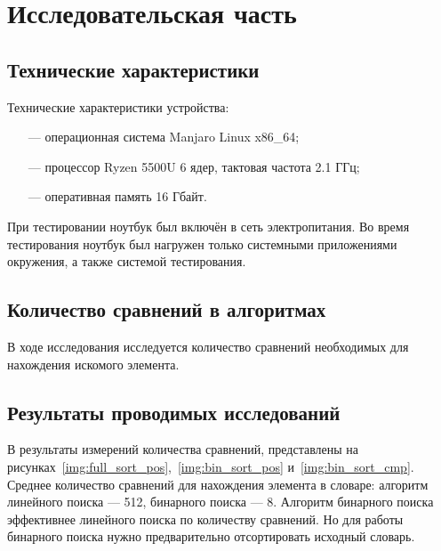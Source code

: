 \chapter{Исследовательская часть}

\section{Технические характеристики}

Технические характеристики устройства:

\begin{itemize}
	\item[---] операционная система Manjaro Linux x86\_64;
	\item[---] процессор Ryzen 5500U 6 ядер, тактовая частота 2.1 ГГц;
	\item[---] оперативная память 16 Гбайт.
\end{itemize}

При тестировании ноутбук был включён в сеть электропитания. Во время тестирования ноутбук был нагружен только системными приложениями окружения, а также системой тестирования.

\section{Количество сравнений в алгоритмах}
В ходе исследования исследуется количество сравнений необходимых для нахождения искомого элемента.


\section{Результаты проводимых исследований}

В результаты измерений количества сравнений, представлены на рисунках~\ref{img:full_sort_pos},~\ref{img:bin_sort_pos} и~\ref{img:bin_sort_cmp}. Среднее количество сравнений для нахождения элемента в словаре: алгоритм линейного поиска --- 512, бинарного поиска --- 8.
Алгоритм бинарного поиска эффективнее линейного поиска по количеству сравнений. Но для работы бинарного поиска нужно предварительно отсортировать исходный словарь.

\clearpage
